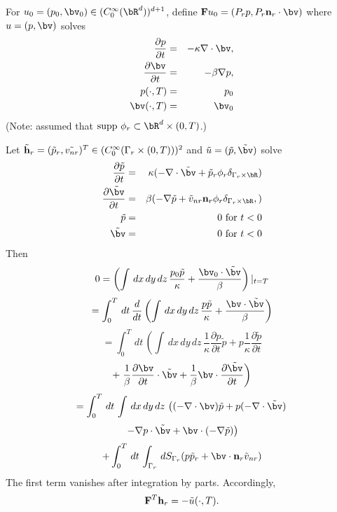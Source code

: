 
For $u_0=(p_0,\bv_0) \in (C_0^{\infty}(\bR^d))^{d+1}$, define ${\bf F}u_0 = (P_r p, P_r {\bf n}_r\cdot \bv)$ where $u=(p,\bv)$ solves
\begin{eqnarray}
\label{eqn:fawedata}
\frac{\partial p}{\partial t} & = & - \kappa \nabla \cdot \bv, \nonumber \\
\frac{\partial \bv}{\partial t} & = & - \beta \nabla p ,\nonumber \\
p(\cdot,T) & =& p_0 \\ 
\bv(\cdot,T) & = & \bv_0\\
\end{eqnarray}
(Note: assumed that $\mbox{supp }\phi_r \subset \bR^d \times (0,T)$.)

Let $\tilde{\bf h}_r=(\tilde{p}_r,\tilde{v_{nr}})^T \in (C_0^{\infty}(\Gamma_r \times (0,T)))^2$ 
and 
$\tilde{u}=(\tilde{p},\tilde{\bv})$ solve 
\begin{eqnarray}
\label{eqn:faweadj}
\frac{\partial \tilde{p}}{\partial t} & = & \kappa (-\nabla \cdot \tilde{\bv} + 
 \tilde{p}_r \phi_r \delta_{\Gamma_r \times \bR})\nonumber \\
\frac{\partial \tilde{\bv}}{\partial t} & = & \beta (-\nabla \tilde{p} + \tilde{v}_{nr}{\bf n}_r \phi_r \delta_{\Gamma_r \times \bR},)\nonumber \\
\tilde{p} & =& 0 \mbox{ for } t<0\nonumber\\ 
\tilde{\bv} & = & 0 \mbox{ for } t<0 
\end{eqnarray} 
Then
\[
0 = 
\left(\int\, dx\,dy\,dz\, \frac{p_0 \tilde{p}}{\kappa} +  
\frac{\bv_0 \cdot \tilde{\bv}}{\beta} \right)|_{t=T}
\]
\[
= 
\int_{0}^{T} \,dt\, \frac{d}{dt}\left(\int\, dx\,dy\,dz\, \frac{p \tilde{p}}{\kappa} +  \frac{\bv \cdot \tilde{\bv}}{\beta} \right)
\]
\[
= 
\int_{0}^{T} \,dt\, \left(\int\, dx\,dy\,dz\, \frac{1}{\kappa} \frac{\partial p}{\partial t} \tilde {p} +  p \frac{1}{\kappa}\frac{\partial \tilde{p}}{\partial t} \right.
\]
\[
+
\left. \frac{1}{\beta} \frac{\partial \bv}{\partial t} \cdot \tilde{\bv} + \frac{1}{\beta} \bv \cdot \frac{\partial \tilde{\bv}}{\partial t} \right)
\]
\[
= 
\int_{0}^{T} \,dt\, \int\, dx\,dy\,dz\, \left((- \nabla \cdot \bv) \tilde{p} + p (- \nabla \cdot \tilde{\bv})\right.
\]
\[
\left.- \nabla p  \cdot \tilde{\bv} + \bv \cdot( -\nabla \tilde{p})\right)
\]
\[
+ \int_0^T \,dt \, \int_{\Gamma_r}\, dS_{\Gamma_r}( p \tilde{p}_r + \bv \cdot {\bf n}_r \tilde{v}_{nr})
\]
The first term vanishes after integration by parts. Accordingly,
\begin{equation}
\label{eqn:fadj}
 {\bf F}^T {\bf h}_r= -\tilde{u}(\cdot,T).
\end{equation}

